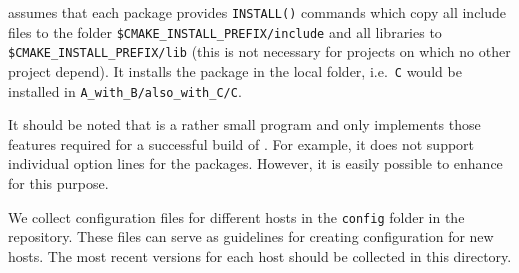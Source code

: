 \BUILDPY assumes that each package provides \lstinline[style=SHELL]|INSTALL()| commands which copy all include files to the folder \lstinline[style=SHELL]|$CMAKE_INSTALL_PREFIX/include| and all libraries to \lstinline[style=SHELL]|$CMAKE_INSTALL_PREFIX/lib| (this is not necessary for projects on which no other project depend). It installs the package in the local folder, i.e.~\lstinline[style=XML]|C| would be installed in \lstinline[style=SHELL]|A_with_B/also_with_C/C|.

It should be noted that \BUILDPY is a rather small program and only implements those features required for a successful build of \MACI. For example, it does not support individual option lines for the packages. However, it is easily possible to enhance \BUILDPY for this purpose.

We collect configuration files for different hosts in the \lstinline[style=SHELL]|config| folder in the \MACI repository. These files can serve as guidelines for creating configuration for new hosts. The most recent versions for each host should be collected in this directory. 
